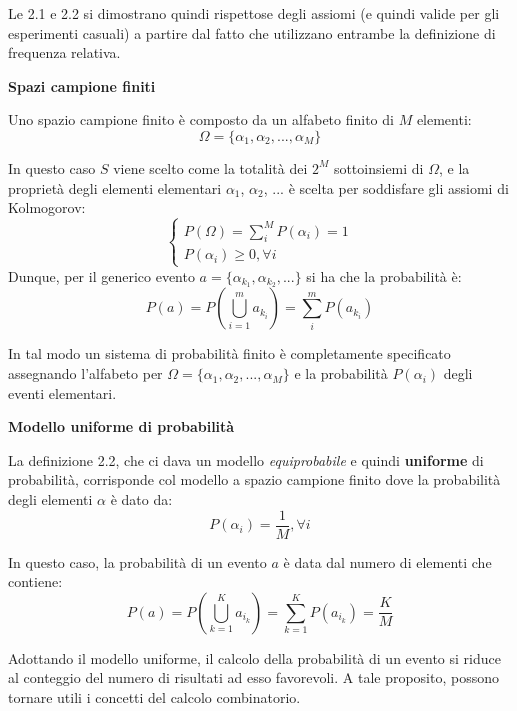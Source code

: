\documentclass[a4paper,11pt]{article}
\begin{document}
Le 2.1 e 2.2 si dimostrano quindi rispettose degli assiomi (e quindi valide per gli esperimenti casuali) a partire dal fatto che utilizzano entrambe la definizione di frequenza relativa.

\par\smallskip

\noindent
\textbf{\textsf{Spazi campione finiti}}

\noindent
Uno spazio campione finito è composto da un alfabeto finito di $M$ elementi:
$$
\Omega = \{\alpha_1, \alpha_2, ..., \alpha_M\}
$$

In questo caso $S$ viene scelto come la totalità dei $2^M$ sottoinsiemi di $\Omega$, e la proprietà degli elementi elementari $\alpha_1$, $\alpha_2$, ... è scelta per soddisfare gli assiomi di Kolmogorov:
\[
	\begin{cases}	
		P(\Omega) = \sum_i^M P(\alpha_i) = 1 \\
		P(\alpha_i) \geq 0, \forall i
	\end{cases}
\]
Dunque, per il generico evento $a = \{ \alpha_{k_1}, \alpha_{k_2}, ... \}$ si ha che la probabilità è:
$$
P(a) = P\left( \bigcup_{i = 1}^m a_{k_i} \right) = \sum_i^m P(a_{k_i})
$$

In tal modo un sistema di probabilità finito è completamente specificato assegnando l’alfabeto per $\Omega = \{\alpha_1, \alpha_2, ..., \alpha_M\}$ e la probabilità $P(\alpha_i)$ degli eventi elementari.

\par\smallskip

\noindent
\textbf{\textsf{Modello uniforme di probabilità}}

\noindent
La definizione 2.2, che ci dava un modello \textit{equiprobabile} e quindi \textbf{uniforme} di probabilità, corrisponde col modello a spazio campione finito dove la probabilità degli elementi $\alpha$ è dato da:
$$
P(\alpha_i) = \frac{1}{M}, \forall i
$$

In questo caso, la probabilità di un evento $a$ è data dal numero di elementi che contiene:
$$
P(a) = P\left(\bigcup_{k=1}^K a_{i_k} \right) = \sum_{k=1}^K P(a_{i_k}) = \frac{K}{M}
$$

Adottando il modello uniforme, il calcolo della probabilità di un evento si riduce al conteggio del numero di risultati ad esso favorevoli. A tale proposito, possono tornare utili i concetti del calcolo combinatorio.
\end{document}
